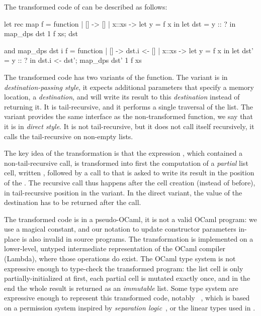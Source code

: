 The transformed code of  can be described as
follows:\\
\hspace{-1.6em}
\begin{minipage}{0.5\linewidth}
\begin{Ocaml}
let rec map f = function
| [] -> []
| x::xs ->
  let y = f x in
  let dst = y :: ? in
  map_dps dst 1 f xs;
  dst
\end{Ocaml}
\end{minipage}
\hfill
\begin{minipage}{0.5\linewidth}
\begin{Ocaml}
and map_dps dst i f = function
| [] ->
  dst.i <- []
| x::xs ->
  let y = f x in
  let dst' = y :: ? in
  dst.i <- dst';
  map_dps dst' 1 f xs
\end{Ocaml}
\end{minipage}

The transformed code has two variants of the  function. The  variant is in \emph{destination-passing style}, it expects additional parameters that specify a memory location, a \emph{destination}, and will write its result to this \emph{destination} instead of returning it. It is tail-recursive, and it performs a single traversal of the list. The  variant provides the same interface as the non-transformed function, we say that it is in \emph{direct style}. It is not tail-recursive, but it does not call itself recursively, it calls the tail-recursive  on non-empty lists.

The key idea of the transformation is that the expression , which contained a non-tail-recursive call, is transformed into first the computation of a \emph{partial} list cell, written , followed by a call to  that is asked to write its result in the position of the . The recursive call thus happens after the cell creation (instead of before), in tail-recursive position in the  variant. In the direct variant, the value of the destination  has to be returned after the call.

The transformed code is in a pseudo-OCaml, it is not a valid OCaml
program: we use a magical  constant, and our notation
 to update constructor parameters in-place is also
invalid in source programs. The transformation is implemented on
a lower-level, untyped intermediate representation of the OCaml
compiler (Lambda), where those operations do exist. The OCaml type
system is not expressive enough to type-check the transformed program:
the list cell is only partially-initialized at first, each partial
cell is mutated exactly once, and in the end the whole result is
returned as an \emph{immutable} list. Some type system are expressive
enough to represent this transformed code, notably \Mezzo~\citep*{mezzo-2016}, which is based on a permission system inspired by \emph{separation logic}~\citep*{seplog-cacm-2019}, or the linear types used in \citet*{minamide-98}.

